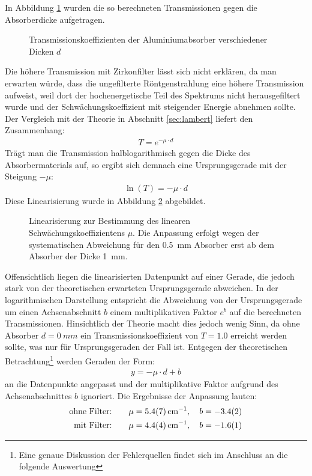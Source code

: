 \documentclass[11pt, a4paper]{article}
\numberwithin{equation}{section}
\begin{document}
In Abbildung \ref{fig:absorber_1} wurden die so berechneten Transmissionen gegen die Absorberdicke aufgetragen.
\begin{figure}[h]
	\centering
	
	\caption{Transmissionskoeffizienten der Aluminiumabsorber verschiedener Dicken $d$}
	\label{fig:absorber_1}
\end{figure}
Die höhere Transmission mit Zirkonfilter lässt sich nicht erklären, da man erwarten würde, dass die ungefilterte Röntgenstrahlung eine höhere Transmission aufweist, weil dort der hochenergetische Teil des Spektrums nicht herausgefiltert wurde und der Schwächungskoeffizient mit steigender Energie abnehmen sollte.
Der Vergleich mit der Theorie in Abschnitt \ref{sec:lambert} liefert den Zusammenhang:
\begin{align}
	T = e^{-\mu \cdot d}
\end{align}
Trägt man die Transmission halblogarithmisch gegen die Dicke des Absorbermaterials auf, so ergibt sich demnach eine Ursprungsgerade mit der Steigung $-\mu$:
\begin{align}
	\ln(T) = - \mu \cdot d
\end{align}
Diese Linearisierung wurde in Abbildung \ref{fig:absorber_1_log} abgebildet.
\begin{figure}[hbt]
	\centering
	
	\caption{Linearisierung zur Bestimmung des linearen Schwächungskoeffizientens $\mu$. Die Anpassung erfolgt wegen der systematischen Abweichung für den \SI{0.5}{mm} Absorber erst ab dem Absorber der Dicke \SI{1}{mm}.}
	\label{fig:absorber_1_log}
\end{figure}
Offensichtlich liegen die linearisierten Datenpunkt auf einer Gerade, die jedoch stark von der theoretischen erwarteten Ursprungsgerade abweichen.
In der logarithmischen Darstellung entspricht die Abweichung von der Ursprungsgerade um einen Achsenabschnitt $b$ einem multiplikativen Faktor $e^b$ auf die berechneten Transmissionen.
Hinsichtlich der Theorie macht dies jedoch wenig Sinn, da ohne Absorber $d = \SI{0}{mm}$ ein Transmissionskoeffizient von $T = \num{1.0}$ erreicht werden sollte, was nur für Ursprungsgeraden der Fall ist.
Entgegen der theoretischen Betrachtung\footnote{Eine genaue Diskussion der Fehlerquellen findet sich im Anschluss an die folgende Auswertung} werden Geraden der Form:
\begin{align}
	y = -\mu \cdot d + b
\end{align}
an die Datenpunkte angepasst und der multiplikative Faktor aufgrund des Achsenabschnittes $b$ ignoriert.
Die Ergebnisse der Anpassung lauten:
\begin{align*}
	\text{ohne Filter:} \qquad \mu = \SI{5.4 +- 0.7}{\per\centi\metre},\quad b = \num{-3.4 +- 0.2}\\
	\text{mit Filter:} \qquad \mu = \SI{4.4 +- 0.4}{\per\centi\metre},\quad b = \num{-1.6 +- 0.1}
\end{align*}
\end{document}
